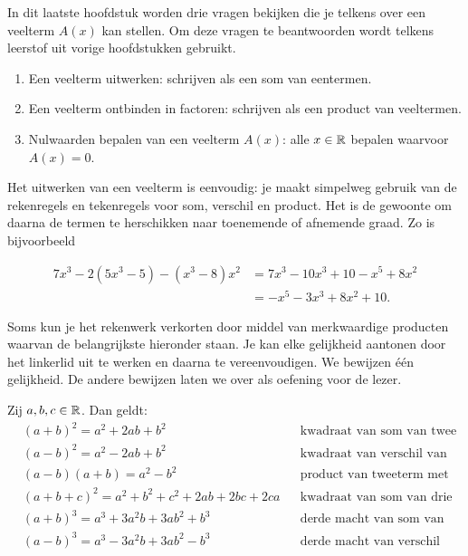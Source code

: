 \documentclass{ximera}
\begin{document}
	\author{Koen de Naeghel - Wiskunde Op Maat}
    \xmsource





In dit laatste hoofdstuk worden drie vragen bekijken die je telkens over een veelterm $A(x)$ kan stellen. 
Om deze vragen te beantwoorden wordt telkens leerstof uit vorige hoofdstukken gebruikt. 

\begin{enumerate}[(1)]
\item
Een veelterm uitwerken: schrijven als een som van eentermen. 
\item
Een veelterm ontbinden in factoren: schrijven als een product van veeltermen.
\item
Nulwaarden bepalen van een veelterm $A(x)$: alle $x \in \mathbb{R}$ bepalen waarvoor $A(x) = 0$. 
\end{enumerate}




Het uitwerken van een veelterm is eenvoudig: je maakt simpelweg gebruik van de rekenregels en tekenregels voor som, verschil en product. Het is de gewoonte om daarna de termen te herschikken naar toenemende of afnemende graad. Zo is bijvoorbeeld

\begin{align*}
7x^3-2(5x^3-5)-(x^3-8)x^2 & = 7x^3 - 10x^3 + 10 - x^5 + 8x^2 \\
& = -x^5 - 3x^3 + 8x^2 + 10.
\end{align*}

Soms kun je het rekenwerk verkorten door middel van merkwaardige producten
waarvan de belangrijkste hieronder staan. Je kan elke gelijkheid aantonen door het linkerlid uit te werken en daarna te vereenvoudigen. We bewijzen één gelijkheid. De andere bewijzen laten we over als oefening voor de lezer. 

\begin{proposition} 
Zij $a,b,c \in \mathbb{R}$. Dan geldt:
\begin{align*}
& (a+b)^2 = a^2+2ab+b^2 && \text{kwadraat van som van twee termen} \\
& (a-b)^2 = a^2-2ab+b^2 && \text{kwadraat van verschil van twee termen} \\
& (a-b)(a+b) = a^2-b^2 && \text{product van tweeterm met zijn toegevoegde} \\
& (a+b+c)^2 = a^2 + b^2 + c^2 + 2ab + 2bc + 2ca && \text{kwadraat van som van drie termen} \\
& (a+b)^3 = a^3+3a^2b+3ab^2+b^3 && \text{derde macht van som van twee termen} \\
& (a-b)^3 = a^3-3a^2b+3ab^2-b^3 && \text{derde macht van verschil van twee termen.}
\end{align*}
\end{proposition} 
\end{document}
